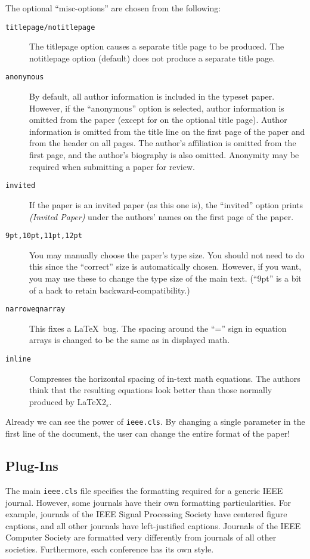 \documentclass[%
	final,
	notitlepage,
	narroweqnarray,
	inline,
	twoside,
	]{ieee}
\newcommand{\latexiie}{\LaTeX2{\Large$_\varepsilon$}}
\begin{document}
The optional ``misc-options'' are chosen from the following:
\begin{description}
\item[\texttt{titlepage/notitlepage}] The titlepage option causes a
    separate title page to be produced. The notitlepage option 
    (default) does not produce a separate title page.
\item[\texttt{anonymous}] By default, all author information is included
    in the typeset paper.
    However, if the ``anonymous'' option is selected, author information
    is omitted from the paper (except for on the optional title page).
    Author information is omitted from the title line on the first
    page of the paper and from the header on all pages. The author's
    affiliation is omitted from the first page, and the author's 
    biography is also omitted. Anonymity may be required when
    submitting a paper for review.
\item[\texttt{invited}] If the paper is an invited paper (as this
    one is), the ``invited'' option prints \emph{(Invited Paper)} under the 
    authors' names on the first page of the paper.
\item[\texttt{9pt,10pt,11pt,12pt}] You may manually choose the paper's 
    type size.
    You should not need to do this since the ``correct'' size is
    automatically chosen. However, if you want, you may use these to
    change the type size of the main text. (``9pt'' is a bit of a hack
    to retain backward-compatibility.)
\item[\texttt{narroweqnarray}] This fixes a \LaTeX\ bug. The
    spacing around the ``='' sign in equation arrays is changed 
    to be the same as in displayed math.  
\item[\texttt{inline}] Compresses the horizontal spacing of in-text
    math equations. The authors think that the resulting equations
    look better than those normally produced by \latexiie.
\end{description}

Already we can see the power of \texttt{ieee.cls}. By changing a
single parameter in the first line of the document, the user can
change the entire format of the paper!

\subsection{Plug-Ins}

The main \texttt{ieee.cls} file specifies the formatting required for
a generic IEEE journal. However, some journals have their own
formatting particularities. For example, journals of the IEEE Signal
Processing Society have centered figure captions, and all other
journals have left-justified captions. Journals of the IEEE Computer
Society are formatted very differently from journals of all other
societies. Furthermore, each conference has its own style.
\end{document}
